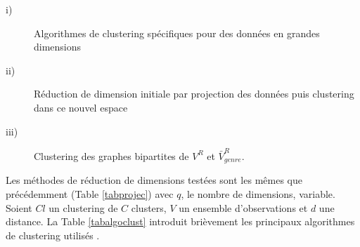       \begin{description}
       \item[i)] Algorithmes de clustering spécifiques pour des données en grandes dimensions 
       \item[ii)] Réduction de dimension initiale par projection des données puis clustering dans ce nouvel espace
	  \item[iii)] Clustering des graphes bipartites de $V^{R}$ et $\bar{V}^{R}_{genre}$.
       \end{description}

        Les méthodes de réduction de dimensions testées sont les mêmes que précédemment (Table \ref{tabprojec}) avec $q$, le nombre de dimensions, variable. Soient $Cl$ un clustering de $C$ clusters, $V$ un ensemble d'observations et $d$ une distance. La Table \ref{tabalgoclust} introduit brièvement les principaux algorithmes de clustering utilisés
.

